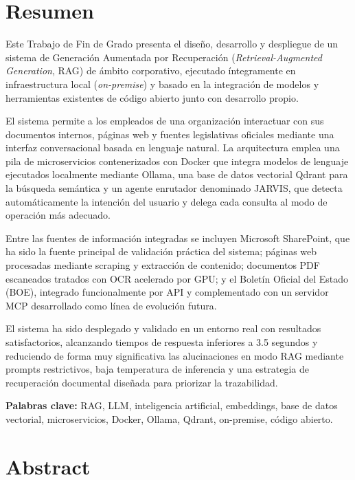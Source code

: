\chapter*{Resumen}

Este Trabajo de Fin de Grado presenta el diseño, desarrollo y despliegue de un sistema de Generación Aumentada por Recuperación (\textit{Retrieval-Augmented Generation}, RAG) de ámbito corporativo, ejecutado íntegramente en infraestructura local (\textit{on-premise}) y basado en la integración de modelos y herramientas existentes de código abierto junto con desarrollo propio.

El sistema permite a los empleados de una organización interactuar con sus documentos internos, páginas web y fuentes legislativas oficiales mediante una interfaz conversacional basada en lenguaje natural. La arquitectura emplea una pila de microservicios contenerizados con Docker que integra modelos de lenguaje ejecutados localmente mediante Ollama, una base de datos vectorial Qdrant para la búsqueda semántica y un agente enrutador denominado JARVIS, que detecta automáticamente la intención del usuario y delega cada consulta al modo de operación más adecuado.

Entre las fuentes de información integradas se incluyen Microsoft SharePoint, que ha sido la fuente principal de validación práctica del sistema; páginas web procesadas mediante scraping y extracción de contenido; documentos PDF escaneados tratados con OCR acelerado por GPU; y el Boletín Oficial del Estado (BOE), integrado funcionalmente por API y complementado con un servidor MCP desarrollado como línea de evolución futura.

El sistema ha sido desplegado y validado en un entorno real con resultados satisfactorios, alcanzando tiempos de respuesta inferiores a 3.5 segundos y reduciendo de forma muy significativa las alucinaciones en modo RAG mediante prompts restrictivos, baja temperatura de inferencia y una estrategia de recuperación documental diseñada para priorizar la trazabilidad.

\vspace{0.5cm}
\noindent\textbf{Palabras clave:} RAG, LLM, inteligencia artificial, embeddings, base de datos vectorial, microservicios, Docker, Ollama, Qdrant, on-premise, código abierto.

\newpage

\chapter*{Abstract}

